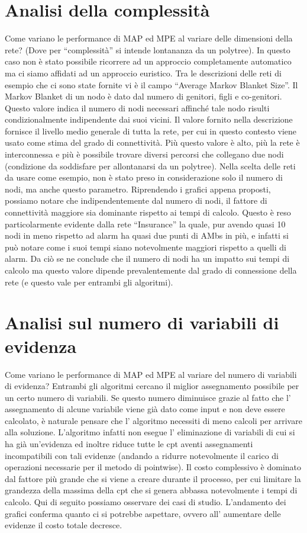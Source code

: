 \section{Analisi della complessità}
Come variano le performance di MAP ed MPE al variare delle dimensioni della rete? (Dove per “complessità” si intende lontananza da un polytree). In questo caso non è stato possibile ricorrere ad un approccio completamente automatico ma ci siamo affidati ad un approccio euristico. Tra le descrizioni delle reti di esempio che ci sono state fornite vi è il campo “Average Markov Blanket Size”. Il Markov Blanket di un nodo è dato dal numero di genitori, figli e co-genitori. Questo valore indica il numero di nodi necessari affinché tale nodo risulti condizionalmente indipendente dai suoi vicini. Il valore fornito nella descrizione fornisce il livello medio generale di tutta la rete, per cui in questo contesto viene usato come stima del grado di connettività. Più questo valore è alto, più la rete è interconnessa e più è possibile trovare diversi percorsi che collegano due nodi (condizione da soddisfare per allontanarsi da un polytree). Nella scelta delle reti da usare come esempio, non è stato preso in considerazione solo il numero di nodi, ma anche questo parametro. Riprendendo i grafici appena proposti, possiamo notare che indipendentemente dal numero di nodi, il fattore di connettività maggiore sia dominante rispetto ai tempi di calcolo. Questo è reso particolarmente evidente dalla rete “Insurance” la quale, pur avendo quasi 10 nodi in meno rispetto ad alarm ha quasi due punti di AMbs in più, e infatti si può notare come i suoi tempi siano notevolmente maggiori rispetto a quelli di alarm. Da ciò se ne conclude che il numero di nodi ha un impatto sui tempi di calcolo ma questo valore dipende prevalentemente dal grado di connessione della rete (e questo vale per entrambi gli algoritmi).

\section{Analisi sul numero di variabili di evidenza}
Come variano le performance di MAP ed MPE al variare del numero di variabili di evidenza? Entrambi gli algoritmi cercano il miglior assegnamento possibile per un certo numero di variabili. Se questo numero diminuisce grazie al fatto che l’ assegnamento di alcune variabile viene già dato come input e non deve essere calcolato, è naturale pensare che l’ algoritmo necessiti di meno calcoli per arrivare alla soluzione.  L’algoritmo infatti non esegue l’ eliminazione di variabili di cui si ha già un’evidenza ed inoltre riduce tutte le cpt aventi assegnamenti incompatibili con tali evidenze (andando a ridurre notevolmente il carico di operazioni necessarie per il metodo di pointwise). Il costo complessivo è dominato dal fattore più grande che si viene a creare durante il processo, per cui limitare la grandezza della massima della cpt che si genera abbassa notevolmente i tempi di calcolo. Qui di seguito possiamo osservare dei casi di studio. 
L’andamento dei grafici conferma quanto ci si potrebbe aspettare, ovvero all’ aumentare delle evidenze il costo totale decresce.

